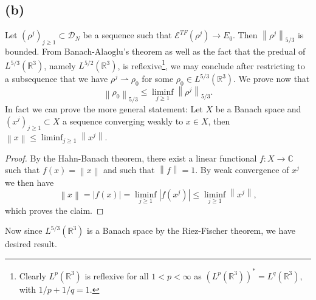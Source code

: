 \documentclass[a4paper,11pt]{article}
\newcommand{\norm}[1]{\left\lVert #1 \right\rVert}
\newcommand{\abs}[1]{\left\lvert #1 \right\rvert}
\newcommand{\R}{\mathbb{R}}
\newcommand{\C}{\mathbb{C}}
\numberwithin{equation}{section}
\begin{document}
\subsection*{(b)}
Let $ (\rho^j)_{j\geq1}\subset \mathcal{D}_N $ be a sequence such that $ \mathcal{E}^{TF}(\rho^j)\to E_0 $. Then $ \norm{\rho^j}_{5/3} $ is bounded. From Banach-Alaoglu's theorem as well as the fact that the predual of $ L^{5/3}(\R^3) $, namely $ L^{5/2}(\R^3) $, is reflexive\footnote{Clearly $ L^p(\R^3) $ is reflexive for all $ 1<p<\infty $ as $ (L^p(\R^3))^\ast=L^q(\R^3) $, with $ 1/p+1/q=1 $.}, we may conclude after restricting to a subsequence that we have $ \rho^j\rightharpoonup\rho_0 $ for some $ \rho_0\in L^{5/3}(\R^3) $. We prove now that \begin{equation}
\norm{\rho_0}_{5/3}\leq\liminf_{j\geq1}\norm{\rho^j}_{5/3}.
\end{equation}
In fact we can prove the more general statement: Let $ X $ be a Banach space and $ (x^j)_{j\geq1}\subset X $ a sequence converging weakly to $ x\in X $, then $ \norm{x}\leq\liminf_{j\geq1}\norm{x^j} $.
\begin{proof}
	By the Hahn-Banach theorem, there exist a linear functional $ f:X\to \C $ such that $ f(x)=\norm{x} $ and such that $ \norm{f}=1 $. By weak convergence of $ x^j $ we then have \begin{equation}
	\norm{x}=\abs{f(x)}=\liminf_{j\geq 1}\abs{f(x^j)}\leq\liminf_{j\geq1}\norm{x^j},
	\end{equation}
	which proves the claim.
\end{proof}
Now since $ L^{5/3}(\R^3) $ is a Banach space by the Riez-Fischer theorem, we have desired result.
\end{document}
